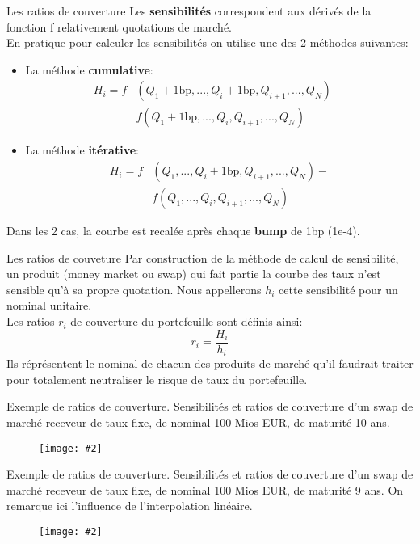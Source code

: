 \documentclass{beamer}
\newcommand{\FIG}[2]{\texttt{[image: \#2]}}
\begin{document}
\begin{frame}{Les ratios de couverture }
Les \textbf{sensibilités} correspondent aux dérivés de la fonction f relativement quotations de marché.\\
En pratique pour calculer les sensibilités on utilise une des 2 méthodes suivantes:
\begin{itemize}
\item La méthode \textbf{cumulative}:
\[
\begin{split}
H_i=f&(Q_1+1\text{bp},...,Q_i+1\text{bp},Q_{i+1},...,Q_{N})-\\
&f(Q_1+1\text{bp},...,Q_i,Q_{i+1},...,Q_{N})
\end{split}
\]
\item La méthode \textbf{itérative}:
\[
\begin{split}
H_i=f&(Q_1,...,Q_i+1\text{bp},Q_{i+1},...,Q_{N})-\\
&f(Q_1,...,Q_i,Q_{i+1},...,Q_{N})
\end{split}
\]
\end{itemize}
Dans les 2 cas, la courbe est recalée après chaque \textbf{bump} de 1bp (1e-4).
\end{frame}

\begin{frame}{Les ratios de couveture}
Par construction de la méthode de calcul de sensibilité, un produit (money market ou swap) qui fait partie la courbe des taux n'est sensible qu'à sa propre quotation. Nous appellerons $h_i$ cette sensibilité pour un nominal unitaire.\\
\vspace{0.5cm}
Les ratios $r_i$ de couverture du portefeuille sont définis ainsi:
\[
r_i=\frac{H_i}{h_i}
\]
Ils réprésentent le nominal de chacun des produits de marché qu'il faudrait traiter pour totalement neutraliser le risque de taux du portefeuille.
\end{frame}

\begin{frame}{Exemple de ratios de couverture.}
Sensibilités et ratios de couverture d'un swap de marché receveur de taux fixe, de nominal 100 Mios EUR, de maturité 10 ans.
\begin{figure}[h]
\FIG{10cm}{figures/hedgeratio1.png}
\end{figure}
\end{frame}

\begin{frame}{Exemple de ratios de couverture.}
Sensibilités et ratios de couverture d'un swap de marché receveur de taux fixe, de nominal 100 Mios EUR, de maturité 9 ans. On remarque ici l'influence de l'interpolation linéaire.
\begin{figure}[h]
\FIG{10cm}{figures/hedgeratio2.png}
\end{figure}
\end{frame}
\end{document}
